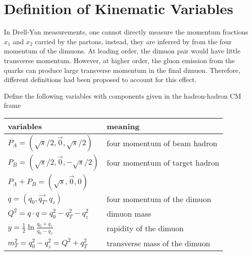 \documentclass[../main.tex]{subfiles}
\begin{document}
\chapter{Definition of Kinematic Variables}
\label{a_ch:kinematic}
In Drell-Yan measurements, one cannot directly measure the momentum fractions
$x_1$ and $x_2$ carried by the partons, instead, they are inferred by from the
four momentum of the dimuons. At leading order, the dimuon pair would have little
transverse momentum. However, at higher order, the gluon emission from the quarks
can produce large transverse momentum in the final dimuon. Therefore, different 
definitions had been proposed to account for this effect.

Define the following variables with components given in the hadron-hadron CM frame
\begin{table}[h!]
\centering
\begin{tabular}{ll}
variables                                                  & meaning                             \\ \hline
$P_A = \left(   \sqrt{s}/2, \vec{0}, \sqrt{s}/2 \right)$  & four momentum of beam hadron        \\
$P_B = \left( \sqrt{s}/2, \vec{0},   -\sqrt{s}/2 \right)$ & four momentum of target hadron      \\
$P_A+P_B=\left(\sqrt{s},\vec{0},0\right)$                 &                                     \\
$q = \left(q_0, \vec{q_T}, q_z\right)$                    & four momentum of the dimuon         \\
$Q^2=q\cdot q=q_0^2-q_T^2-q_z^2$                          & dimuon mass                         \\
$y=\frac{1}{2}\ln \frac{q_0 +   q_z}{q_0-q_z}$            & rapidity of the dimuon              \\
$m_T^2 = q_0^2 - q_z^2=Q^2+q_T^2$                         & transverse mass of the dimuon      
\end{tabular}
\end{table}
\end{document}
